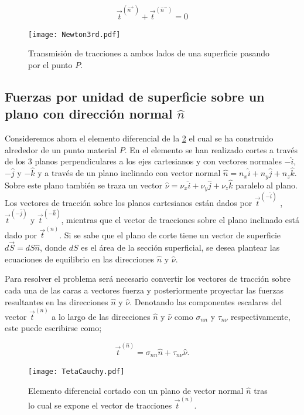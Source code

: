 \documentclass[../notas medios.tex]{subfiles}
\begin{document}
\begin{equation}
{\vec t^{({{\hat n}^ + })}} + {\vec t^{({{\hat n}^ - })}} = 0
\label{third}
\end{equation}

\begin{figure}[H]
\centering
	\texttt{[image: Newton3rd.pdf]}
	\caption{Transmisión de tracciones a ambos lados de una superficie pasando por el punto $P$.}
	\label{Newton3rd}
\end{figure}

\subsection{Fuerzas por unidad de superficie sobre un plano con dirección normal $\hat{n}$}
Consideremos ahora el elemento diferencial de la \cref{TetraCauchy} el cual se ha
construido alrededor de un punto material $P$. En el elemento se han realizado
cortes a través de los 3 planos perpendiculares a los ejes cartesianos y con
vectores normales $-\hat{i}$, $-\hat{j}$ y $-\hat{k}$ y a través de un plano
inclinado con vector normal $\hat{n}=n_x \hat{i}+n_y \hat{j}+n_z \hat{k}$. Sobre
este plano también se traza un vector $\hat{\nu}=\nu_x \hat{i}+\nu_y
\hat{j}+\nu_z \hat{k}$ paralelo al plano. Los vectores de tracción sobre los
planos cartesianos están dados por ${{\vec t}^{( - \hat i)}}$ , ${{\vec t}^{( -
\hat j)}}$ y ${{\vec t}^{( - \hat k)}}$, mientras que el vector de tracciones
sobre el plano inclinado está dado por ${{\vec t}^{(n)}}$. Si se sabe que el
plano de corte tiene un vector de superficie $d\vec S = dS\hat n$, donde $dS$ es
el área de la sección superficial, se desea plantear las ecuaciones de equilibrio en las direcciones $\hat{n}$ y $\hat{\nu}$.

Para resolver el problema será necesario convertir los vectores de tracción
sobre cada una de las caras a vectores fuerza y posteriormente proyectar las
fuerzas resultantes en las direcciones $\hat{n}$ y $\hat{\nu}$. Denotando las
componentes escalares del vector ${{\vec t}^{(n)}}$ a lo largo de las
direcciones $\hat{n}$ y $\hat{\nu}$ como ${\sigma _{nn}}$ y ${\tau _{n\nu }}$
respectivamente, este puede escribirse como;

\begin{equation}
{{\vec t}^{(\hat n)}} = {\sigma _{nn}}\hat n + {\tau _{n\nu }}\hat \nu.
\label{incltract}
\end{equation}
%
\begin{figure}[H]
\centering
	\texttt{[image: TetaCauchy.pdf]}
	\caption{Elemento diferencial cortado con un plano de vector normal $\hat{n}$ tras lo cual se expone el vector de tracciones ${{\vec t}^{(n)}}$.}
	\label{TetraCauchy}
\end{figure}
%
\end{document}

